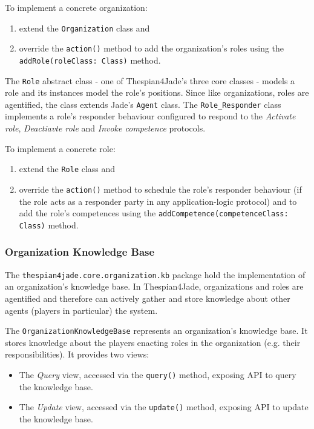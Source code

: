 To implement a concrete organization:
\begin{enumerate}
	\item extend the \texttt{Organization} class and
	\item override the \texttt{action()} method to add the organization's roles using the \texttt{addRole(roleClass: Class)} method.	
\end{enumerate}

The \texttt{Role} abstract class - one of Thespian4Jade's three core classes - models a role and its instances model the role's positions.
Since like organizations, roles are agentified, the class extends Jade's \texttt{Agent} class.
The \texttt{Role\_Responder} class implements a role's responder behaviour configured to respond to the \textit{Activate role}, \textit{Deactiavte role} and \textit{Invoke competence} protocols.

To implement a concrete role:
\begin{enumerate}
	\item extend the \texttt{Role} class and
	\item override the \texttt{action()} method to schedule the role's responder behaviour (if the role acts as a responder party in any application-logic protocol) and to add the role's competences using the \texttt{addCompetence(competenceClass: Class)} method.	
\end{enumerate}

\subsubsection{Organization Knowledge Base}

The \texttt{thespian4jade.core.organization.kb} package hold the implementation of an organization's knowledge base.
In Thespian4Jade, organizations and roles are agentified and therefore can actively gather and store knowledge about other agents (players in particular) the system.

The \texttt{OrganizationKnowledgeBase} represents an organization's knowledge base.
It stores knowledge about the players enacting roles in the organization (e.g. their responsibilities).
It provides two views:
\begin{itemize}
	\item The \textit{Query} view, accessed via the \texttt{query()} method, exposing API to query the knowledge base.
	\item The \textit{Update} view, accessed via the \texttt{update()} method, exposing API to update the knowledge base.
\end{itemize}

